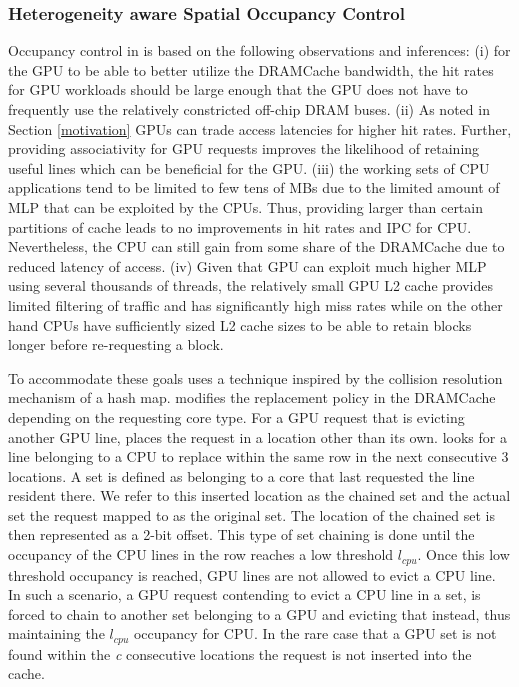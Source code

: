 \subsubsection{Heterogeneity aware Spatial Occupancy Control}
Occupancy control in \cachename is based on the following observations and inferences: (i) for the GPU to be able to better utilize the DRAMCache bandwidth, the hit rates for GPU workloads should be large enough that the GPU does not have to frequently use the relatively constricted off-chip DRAM buses. (ii) As noted in Section \ref{motivation} GPUs can trade access latencies for higher hit rates. Further, providing associativity for GPU requests improves the likelihood of retaining useful lines which can be beneficial for the GPU. (iii) the working sets of CPU applications tend to be limited to few tens of MBs due to the limited amount of MLP that can be exploited by the CPUs. Thus, providing larger than certain partitions of cache leads to no improvements in hit rates and IPC for CPU. Nevertheless, the CPU can still gain from some share of the DRAMCache due to reduced latency of access. (iv) Given that GPU can exploit much higher MLP using several thousands of threads, the relatively small GPU L2 cache provides limited filtering of traffic and has significantly high miss rates while on the other hand CPUs have sufficiently sized L2 cache sizes to be able to retain blocks longer before re-requesting a block.
\par To accommodate these goals \cachename uses a technique inspired by the collision resolution mechanism of a hash map. \cachename modifies the replacement policy in the DRAMCache depending on the requesting core type. For a GPU request that is evicting another GPU line, \cachename places the request in a location other than its own. \cachename looks for a line belonging to a CPU to replace within the same row in the next consecutive 3 locations. A set is defined as belonging to a core that last requested the line resident there. We refer to this inserted location as the chained set and the actual set the request mapped to as the original set. The location of the chained set is then represented as a 2-bit offset. This type of set chaining is done until the occupancy of the CPU lines in the row reaches a low threshold \textit{$l_{cpu}$}. Once this low threshold occupancy is reached, GPU lines are not allowed to evict a CPU line. In such a scenario, a GPU request contending to evict a CPU line in a set, is forced to chain to another set belonging to a GPU and evicting that instead, thus maintaining the \textit{$l_{cpu}$} occupancy for CPU. In the rare case that a GPU set is not found within the \textit{c} consecutive locations the request is not inserted into the cache.

